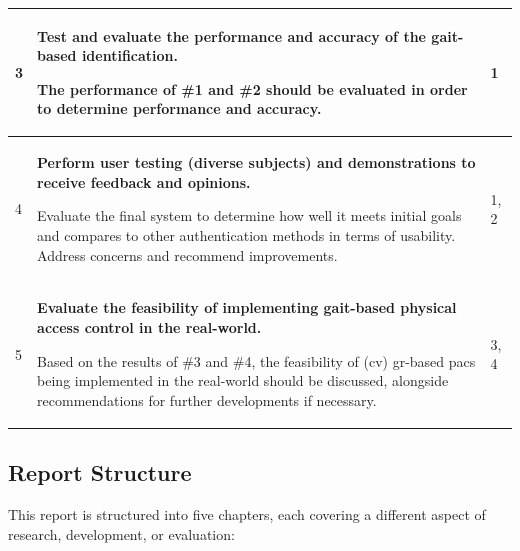 \begin{scriptsize}
\begin{longtable}[c]{|p{}|p{}|p{}|}
        3           & \textbf{Test and evaluate the performance and accuracy of the gait-based identification.} \par The performance of \#1 and \#2 should be evaluated in order to determine performance and accuracy.                                                                                                                                        & 1                     \\ \hline
        4           & \textbf{Perform user testing (diverse subjects) and demonstrations to receive feedback and opinions.} \par Evaluate the final system to determine how well it meets initial goals and compares to other authentication methods in terms of usability. Address concerns and recommend improvements.                                       & 1, 2                  \\ \hline
        5           & \textbf{Evaluate the feasibility of implementing gait-based physical access control in the real-world.} \par Based on the results of \#3 and \#4, the feasibility of (\ac{cv}) \ac{gr}-based \ac{pacs} being implemented in the real-world should be discussed, alongside recommendations for further developments if necessary.         & 3, 4                  \\
    \end{longtable}
\end{scriptsize}

\subsection{Report Structure}
\label{sec:report-structure}

This report is structured into five chapters, each covering a different aspect of research, development, or evaluation:

